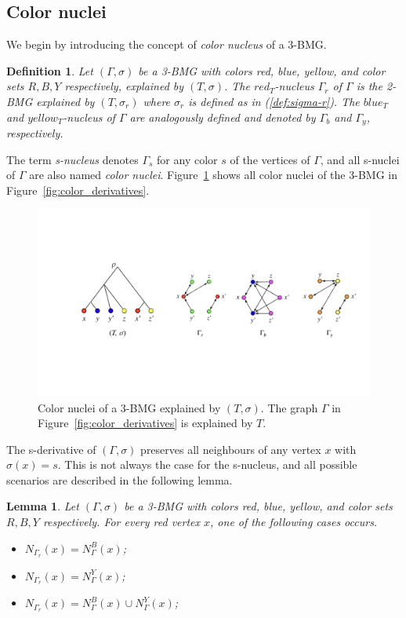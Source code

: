 \documentclass[final,3p,times]{elsarticle}
\newtheorem{lemma}[theorem]{Lemma}%
\newtheorem{definition}{Definition}[section]
\begin{document}
\subsection{Color nuclei}
We begin by introducing the concept of \emph{color nucleus} of a 3-BMG. 
\begin{definition}
Let $(\Gamma,\sigma)$ be a 3-BMG with colors red, blue, yellow, and color sets $R,B,Y$ respectively, explained by $(T,\sigma)$. The $red_T${\emph{-nucleus}} $\Gamma_r$ of $\Gamma$ is the 2-BMG explained by $(T,\sigma_r)$ where $\sigma_r$ is defined as in (\ref{def:sigma-r}). The $blue_T$ and $yellow_T${\emph{-nucleus}} of $\Gamma$ are analogously defined and denoted by $\Gamma_b$ and $\Gamma_y$, respectively. 
\end{definition}
The term \emph{s-nucleus} denotes $\Gamma_s$ for any color $s$ of the vertices of $\Gamma$, and all s-nuclei of $\Gamma$ are also named \emph{color nuclei}. Figure~\ref{fig:color_nuclei} shows all color nuclei of the 3-BMG in Figure~\ref{fig:color_derivatives}.
\begin{figure}[ht]
  \centering
    \includegraphics[width=16cm]{figures/color_nuclei.jpeg}
    \caption{Color nuclei of a 3-BMG explained by $(T,\sigma)$. The graph $\Gamma$ in Figure~\ref{fig:color_derivatives} is explained by $T$.}
      \label{fig:color_nuclei}
\end{figure}
The s-derivative of $(\Gamma,\sigma)$ preserves all neighbours of any vertex $x$ with $\sigma(x)=s$. This is not always the case for the s-nucleus, and all possible scenarios are described in the following lemma. 
\begin{lemma}
\label{lemma:neighbours_condition}
Let $(\Gamma,\sigma)$ be a 3-BMG with colors red, blue, yellow, and color sets $R,B,Y$ respectively. For every red vertex $x$, one of the following cases occurs.
\begin{itemize}
\item[(i)] $N_{\Gamma_r}(x)=N_{\Gamma}^{B}(x)$;
\item[(ii)] $N_{\Gamma_r}(x)=N_{\Gamma}^{Y}(x)$;
\item[(iii)] $N_{\Gamma_r}(x)=N_{\Gamma}^{B}(x)\cup N_{\Gamma}^{Y}(x)$;
\end{itemize}
\end{lemma}
\end{document}

